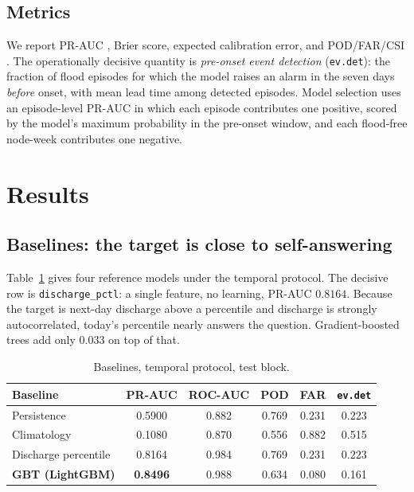 \documentclass[conference]{IEEEtran}
\begin{document}
\subsection{Metrics}
\label{sec:metrics}
We report PR-AUC \cite{davis2006,saito2015}, Brier score, expected calibration
error, and POD/FAR/CSI \cite{jolliffe2012}. The operationally decisive quantity
is \emph{pre-onset event detection} (\texttt{ev.det}): the fraction of flood
episodes for which the model raises an alarm in the seven days \emph{before}
onset, with mean lead time among detected episodes. Model selection uses an
episode-level PR-AUC in which each episode contributes one positive, scored by
the model's maximum probability in the pre-onset window, and each flood-free
node-week contributes one negative.

\section{Results}

\subsection{Baselines: the target is close to self-answering}
\label{sec:baselines}
Table~\ref{tab:baselines} gives four reference models under the temporal
protocol. The decisive row is \texttt{discharge\_pctl}: a single feature, no
learning, PR-AUC $0.8164$. Because the target is next-day discharge above a
percentile and discharge is strongly autocorrelated, today's percentile nearly
answers the question. Gradient-boosted trees add only $0.033$ on top of that.

\begin{table}[t]
\caption{Baselines, temporal protocol, test block.}
\label{tab:baselines}
\centering
\footnotesize
\begin{tabular}{@{}lccccc@{}}
\toprule
Baseline & PR-AUC & ROC-AUC & POD & FAR & \texttt{ev.det} \\
\midrule
Persistence          & 0.5900 & 0.882 & 0.769 & 0.231 & 0.223 \\
Climatology          & 0.1080 & 0.870 & 0.556 & 0.882 & 0.515 \\
Discharge percentile & 0.8164 & 0.984 & 0.769 & 0.231 & 0.223 \\
\textbf{GBT (LightGBM)} & \textbf{0.8496} & 0.988 & 0.634 & 0.080 & 0.161 \\
\bottomrule
\end{tabular}
\end{table}
\end{document}
